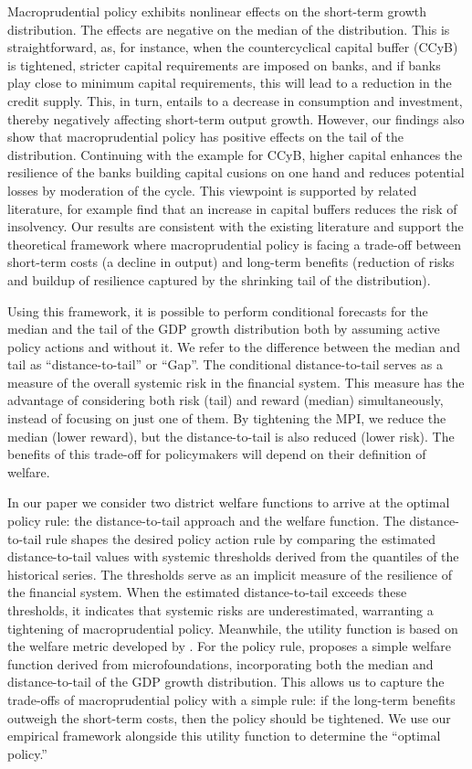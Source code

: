 Macroprudential policy exhibits nonlinear effects on the short-term growth distribution. The effects are negative on the median of the distribution. This is straightforward, as, for instance, when the countercyclical capital buffer (CCyB) is tightened, stricter capital requirements are imposed on banks, and if banks play close to minimum capital requirements, this will lead to a reduction in the credit supply. This, in turn, entails to a decrease in consumption and investment, thereby negatively affecting short-term output growth. However, our findings also show that macroprudential policy has positive effects on the tail of the distribution. Continuing with the example for CCyB, higher capital enhances the resilience of the banks building capital cusions on one hand and reduces potential losses by moderation of the cycle. This viewpoint is supported by related literature, for example \citet{jimnez2017} find that an increase in capital buffers reduces the risk of insolvency. Our results are consistent with the existing literature \citep{galan2020} and support the theoretical framework where macroprudential policy is facing a trade-off between short-term costs (a decline in output) and long-term benefits (reduction of risks and buildup of resilience captured by the shrinking tail of the distribution).

Using this framework, it is possible to perform conditional forecasts for the median and the tail of the GDP growth distribution both by assuming active policy actions and without it. We refer to the difference between the median and tail as ``distance-to-tail'' or ``Gap''. The conditional distance-to-tail serves as a measure of the overall systemic risk in the financial system. This measure has the advantage of considering both risk (tail) and reward (median) simultaneously, instead of focusing on just one of them. By tightening the MPI, we reduce the median (lower reward), but the distance-to-tail is also reduced (lower risk). The benefits of this trade-off for policymakers will depend on their definition of welfare.

In our paper we consider two district welfare functions to arrive at the optimal policy rule: the distance-to-tail approach \citep{esrb2024} and the \citet{suarez2022} welfare function. The distance-to-tail rule shapes the desired policy action rule by comparing the estimated distance-to-tail values with systemic thresholds derived from the quantiles of the historical series. The thresholds serve as an implicit measure of the resilience of the financial system. When the estimated distance-to-tail exceeds these thresholds, it indicates that systemic risks are underestimated, warranting a tightening of macroprudential policy. Meanwhile, the utility function is based on the welfare metric developed by \citet{suarez2022}. For the policy rule, \citet{suarez2022} proposes a simple welfare function derived from microfoundations, incorporating both the median and distance-to-tail of the GDP growth distribution. This allows us to capture the trade-offs of macroprudential policy with a simple rule: if the long-term benefits outweigh the short-term costs, then the policy should be tightened. We use our empirical framework alongside this utility function to determine the “optimal policy.” 

